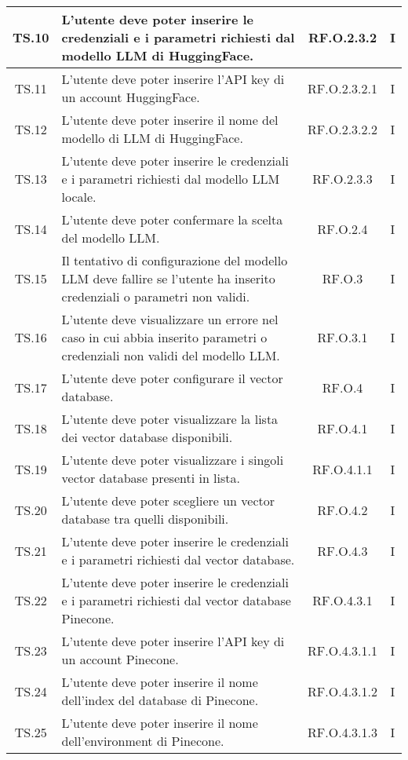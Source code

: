 {{{{{{{{{{\begin{xltabular}{\textwidth}{|c|X|c|c|}
    \hline
    TS.10 & L’utente deve poter inserire le credenziali e i parametri richiesti dal modello LLM di HuggingFace. & RF.O.2.3.2 & I \\
    \hline
    TS.11 & L’utente deve poter inserire l’API key di un account HuggingFace. & RF.O.2.3.2.1 & I \\
    \hline
    TS.12 & L’utente deve poter inserire il nome del modello di LLM di HuggingFace. & RF.O.2.3.2.2 & I \\
    \hline
    TS.13 & L’utente deve poter inserire le credenziali e i parametri richiesti dal modello LLM locale. & RF.O.2.3.3 & I \\
    \hline
    TS.14 & L’utente deve poter confermare la scelta del modello LLM. & RF.O.2.4 & I \\
    \hline
    TS.15 & Il tentativo di configurazione del modello LLM deve fallire se l’utente ha inserito credenziali o parametri non validi. & RF.O.3 & I \\
    \hline
    TS.16 & L’utente deve visualizzare un errore nel caso in cui abbia inserito parametri o credenziali non validi del modello LLM. & RF.O.3.1 & I \\
    \hline
    TS.17 & L’utente deve poter configurare il vector database. & RF.O.4 & I \\
    \hline
    TS.18 & L’utente deve poter visualizzare la lista dei vector database disponibili. & RF.O.4.1 & I \\
    \hline
    TS.19 & L’utente deve poter visualizzare i singoli vector database presenti in lista. & RF.O.4.1.1 & I \\
    \hline
    TS.20 & L’utente deve poter scegliere un vector database tra quelli disponibili. & RF.O.4.2 & I \\
    \hline
    TS.21 & L’utente deve poter inserire le credenziali e i parametri richiesti dal vector database. & RF.O.4.3 & I \\
    \hline
    TS.22 & L’utente deve poter inserire le credenziali e i parametri richiesti dal vector database Pinecone. & RF.O.4.3.1 & I \\
    \hline
    TS.23 & L’utente deve poter inserire l’API key di un account Pinecone. & RF.O.4.3.1.1 & I \\
    \hline
    TS.24 & L’utente deve poter inserire il nome dell’index del database di Pinecone. & RF.O.4.3.1.2 & I \\
    \hline
    TS.25 & L’utente deve poter inserire il nome dell’environment di Pinecone. & RF.O.4.3.1.3 & I \\

\end{xltabular}}}}}}}}}}}

